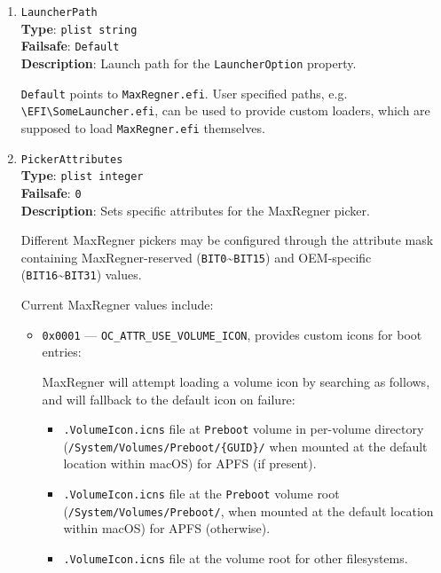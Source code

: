 \documentclass[]{article}
\providecommand{\tightlist}{%
  \setlength{\itemsep}{0pt}\setlength{\parskip}{0pt}}
\begin{document}
\begin{enumerate}
\item
  \texttt{LauncherPath}\\
  \textbf{Type}: \texttt{plist\ string}\\
  \textbf{Failsafe}: \texttt{Default}\\
  \textbf{Description}: Launch path for the \texttt{LauncherOption} property.

  \texttt{Default} points to \texttt{MaxRegner.efi}. User specified paths,
  e.g. \texttt{\textbackslash EFI\textbackslash SomeLauncher.efi},
  can be used to provide custom loaders, which are supposed to
  load \texttt{MaxRegner.efi} themselves.

\item
  \texttt{PickerAttributes}\\
  \textbf{Type}: \texttt{plist\ integer}\\
  \textbf{Failsafe}: \texttt{0}\\
  \textbf{Description}: Sets specific attributes for the MaxRegner picker.

  Different MaxRegner pickers may be configured through the attribute mask containing
  MaxRegner-reserved (\texttt{BIT0}\textasciitilde\texttt{BIT15}) and OEM-specific
  (\texttt{BIT16}\textasciitilde\texttt{BIT31}) values.

  Current MaxRegner values include:

  \begin{itemize}
  \tightlist
  \item \texttt{0x0001} --- \texttt{OC\_ATTR\_USE\_VOLUME\_ICON}, provides custom icons
    for boot entries:

    MaxRegner will attempt loading a volume icon by searching
    as follows, and will fallback to the default icon on failure:
    \begin{itemize}
    \tightlist
      \item \texttt{.VolumeIcon.icns} file at \texttt{Preboot} volume in per-volume directory
       (\texttt{/System/Volumes/Preboot/\{GUID\}/} when mounted at the default location within
       macOS) for APFS (if present).
      \item \texttt{.VolumeIcon.icns} file at the \texttt{Preboot} volume root
      (\texttt{/System/Volumes/Preboot/}, when mounted at the default location within macOS)
      for APFS (otherwise).
      \item \texttt{.VolumeIcon.icns} file at the volume root for other filesystems.
    \end{itemize} \medskip


\end{itemize}
\end{enumerate}
\end{document}
